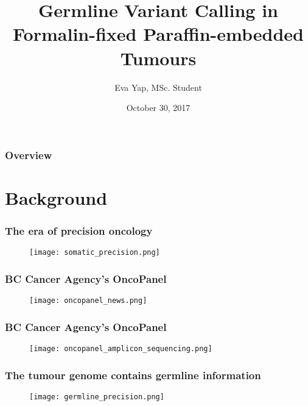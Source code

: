 \documentclass{beamer}
\title{Germline Variant Calling in Formalin-fixed Paraffin-embedded Tumours}
\author{Eva Yap, MSc. Student}
\date{October 30, 2017}
\begin{document}
\frame{\titlepage}

\begin{frame}
\frametitle{Overview}
\tableofcontents
\end{frame}


\section{Background}

\begin{frame}
\frametitle{The era of precision oncology}
\begin{figure}[t]
    \texttt{[image: somatic\_precision.png]}
\end{figure}
\end{frame}

\begin{frame}
\frametitle{BC Cancer Agency's OncoPanel}
\begin{figure}[t]
    \texttt{[image: oncopanel\_news.png]}
\end{figure}
\end{frame}

\begin{frame}
\frametitle{BC Cancer Agency's OncoPanel}
\begin{figure}[t]
    \texttt{[image: oncopanel\_amplicon\_sequencing.png]}
\end{figure}
\begin{enumerate}
\end{enumerate}
\end{frame}

\begin{frame}
\frametitle{The tumour genome contains germline information}
\begin{figure}[t]
    \texttt{[image: germline\_precision.png]}
\end{figure}
\end{frame}
\end{document}
